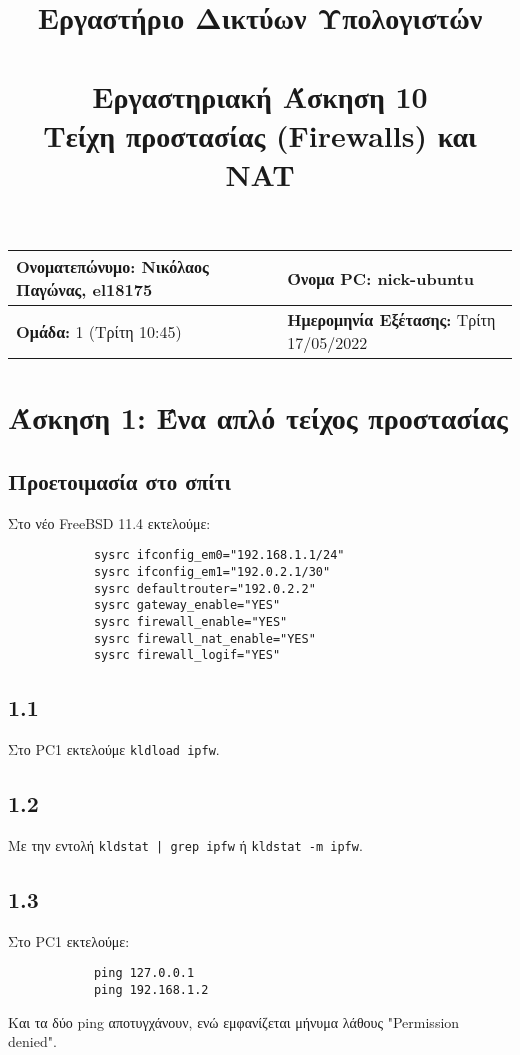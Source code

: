 \documentclass[a4paper, 12pt]{article}
\title{
	\textbf{Εργαστήριο Δικτύων Υπολογιστών} \\~\\
	Εργαστηριακή Άσκηση 10 \\ 
	Τείχη προστασίας (Firewalls) και NAT
}
\author{}
\date{}
\begin{document}
\maketitle
\begin{center}
	\begin{tabular}{|l|l|}
		\hline
		\textbf{Ονοματεπώνυμο:} Νικόλαος Παγώνας, el18175  & \textbf{Όνομα PC:} nick-ubuntu \\
		\hline
		\textbf{Ομάδα:} 1 (Τρίτη 10:45) & \textbf{Ημερομηνία Εξέτασης:} Τρίτη 17/05/2022 \\
		\hline
	\end{tabular}
\end{center}

\section*{Άσκηση 1: Ένα απλό τείχος προστασίας}
	\subsection*{Προετοιμασία στο σπίτι}
		Στο νέο FreeBSD 11.4 εκτελούμε:
		
		\begin{verbatim}
			sysrc ifconfig_em0="192.168.1.1/24"
			sysrc ifconfig_em1="192.0.2.1/30"
			sysrc defaultrouter="192.0.2.2"
			sysrc gateway_enable="YES"
			sysrc firewall_enable="YES"
			sysrc firewall_nat_enable="YES"
			sysrc firewall_logif="YES"
		\end{verbatim}

	\subsection*{1.1}
		Στο PC1 εκτελούμε \verb|kldload ipfw|.

	\subsection*{1.2}
		Με την εντολή \verb+kldstat | grep ipfw+ ή \verb|kldstat -m ipfw|.

	\subsection*{1.3}
		Στο PC1 εκτελούμε:
		
		\begin{verbatim}
			ping 127.0.0.1
			ping 192.168.1.2
		\end{verbatim}
		
		Και τα δύο ping αποτυγχάνουν, ενώ εμφανίζεται μήνυμα λάθους "Permission denied".
\end{document}
